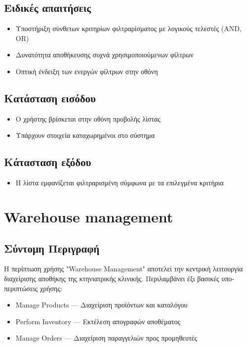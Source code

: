 \documentclass[12pt,a4paper,twoside]{book}
\begin{document}
\subsection{Ειδικές απαιτήσεις} %
\begin{itemize}
  \item Υποστήριξη σύνθετων κριτηρίων φιλτραρίσματος με λογικούς τελεστές (AND, OR)
  \item Δυνατότητα αποθήκευσης συχνά χρησιμοποιούμενων φίλτρων
  \item Οπτική ένδειξη των ενεργών φίλτρων στην οθόνη %
\end{itemize}

\subsection{Κατάσταση εισόδου} %
\begin{itemize}
  \item Ο χρήστης βρίσκεται στην οθόνη προβολής λίστας
  \item Υπάρχουν στοιχεία καταχωρημένοι στο σύστημα
\end{itemize}

\subsection{Κάτασταση εξόδου} %
\begin{itemize}
  \item Η λίστα εμφανίζεται φιλτραρισμένη σύμφωνα με τα επιλεγμένα κριτήρια
\end{itemize}

\section{Warehouse management}

\subsection{Σύντομη Περιγραφή}
Η περίπτωση χρήσης "Warehouse Management" αποτελεί την κεντρική λειτουργία διαχείρισης αποθήκης της κτηνιατρικής κλινικής. Περιλαμβάνει έξι βασικές υπο-περιπτώσεις χρήσης: %
\begin{itemize}
  \item Manage Products --- Διαχείριση προϊόντων και καταλόγου
  \item Perform Inventory --- Εκτέλεση απογραφών αποθέματος
  \item Manage Orders --- Διαχείριση παραγγελιών προς προμηθευτές
\end{itemize}
\end{document}
